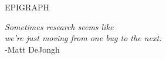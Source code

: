 \begin{center}
EPIGRAPH
\end{center}
\bigskip
\bigskip
\bigskip
\bigskip
\bigskip
\bigskip
\bigskip
\bigskip
\bigskip
\bigskip
\bigskip
\bigskip
\bigskip
\bigskip
\bigskip
\bigskip
\bigskip
\bigskip
\bigskip
\bigskip
\bigskip
\bigskip
\bigskip
\bigskip
\hspace*{\fill} \textit{Sometimes research seems like} \\
\hspace*{\fill} \textit{we're just moving from one bug to the next.}\\
\hspace*{\fill} -Matt DeJongh